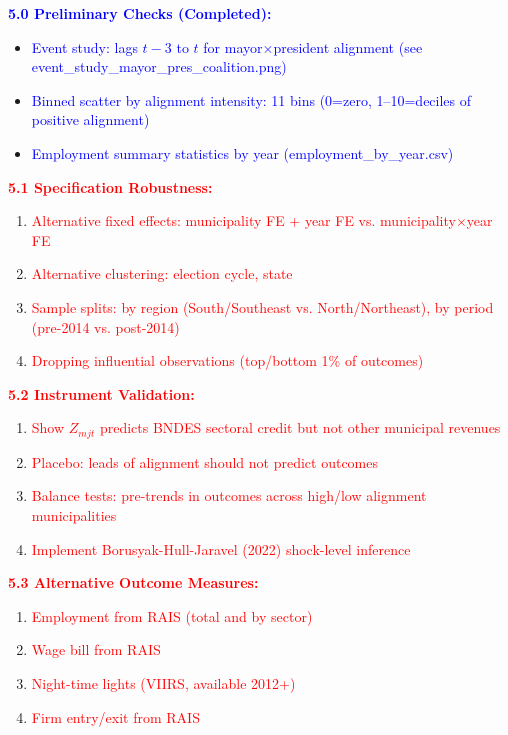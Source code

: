 \documentclass{article}
\begin{document}
\textcolor{blue}{\textbf{5.0 Preliminary Checks (Completed):}}
\begin{itemize}
    \item \textcolor{blue}{Event study: lags $t-3$ to $t$ for mayor$\times$president alignment (see event\_study\_mayor\_pres\_coalition.png)}
    \item \textcolor{blue}{Binned scatter by alignment intensity: 11 bins (0=zero, 1--10=deciles of positive alignment)}
    \item \textcolor{blue}{Employment summary statistics by year (employment\_by\_year.csv)}
\end{itemize}

\textcolor{red}{\textbf{5.1 Specification Robustness:}}
\begin{enumerate}
    \item \textcolor{red}{Alternative fixed effects: municipality FE + year FE vs. municipality$\times$year FE}
    \item \textcolor{red}{Alternative clustering: election cycle, state}
    \item \textcolor{red}{Sample splits: by region (South/Southeast vs. North/Northeast), by period (pre-2014 vs. post-2014)}
    \item \textcolor{red}{Dropping influential observations (top/bottom 1\% of outcomes)}
\end{enumerate}

\textcolor{red}{\textbf{5.2 Instrument Validation:}}
\begin{enumerate}
    \item \textcolor{red}{Show $Z_{mjt}$ predicts BNDES sectoral credit but not other municipal revenues}
    \item \textcolor{red}{Placebo: leads of alignment should not predict outcomes}
    \item \textcolor{red}{Balance tests: pre-trends in outcomes across high/low alignment municipalities}
    \item \textcolor{red}{Implement Borusyak-Hull-Jaravel (2022) shock-level inference}
\end{enumerate}

\textcolor{red}{\textbf{5.3 Alternative Outcome Measures:}}
\begin{enumerate}
    \item \textcolor{red}{Employment from RAIS (total and by sector)}
    \item \textcolor{red}{Wage bill from RAIS}
    \item \textcolor{red}{Night-time lights (VIIRS, available 2012+)}
    \item \textcolor{red}{Firm entry/exit from RAIS}
\end{enumerate}
\end{document}
